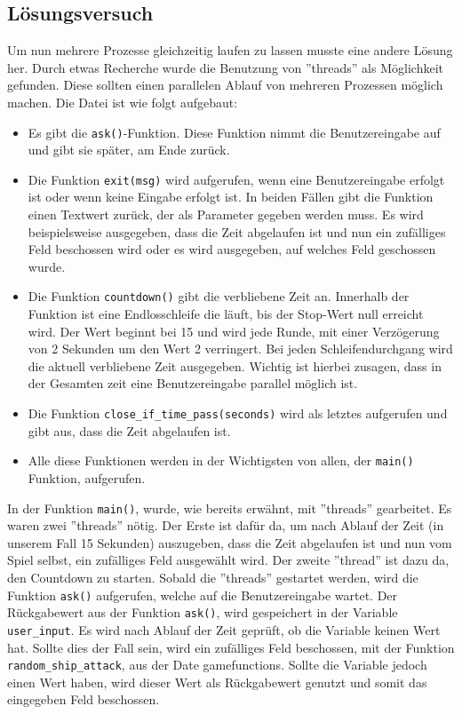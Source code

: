 \documentclass{article}
\begin{document}
\subsection{Lösungsversuch}
    Um nun mehrere Prozesse gleichzeitig laufen zu lassen musste eine andere Lösung her. Durch etwas Recherche wurde die Benutzung von ''threads'' als Möglichkeit gefunden. Diese sollten einen parallelen Ablauf von mehreren Prozessen möglich machen. Die Datei ist wie folgt aufgebaut:
    \setlist{}%
\begin{itemize}
\itemsep0em
    \item
    Es gibt die \verb$ask()$-Funktion. Diese Funktion nimmt die Benutzereingabe auf und gibt sie später, am Ende zurück.
    \item
    Die Funktion \verb$exit(msg)$ wird aufgerufen, wenn eine Benutzereingabe erfolgt ist oder wenn keine Eingabe erfolgt ist. In beiden Fällen gibt die Funktion einen Textwert zurück, der als Parameter gegeben werden muss. Es wird beispielsweise ausgegeben, dass die Zeit abgelaufen ist und nun ein zufälliges Feld beschossen wird oder es wird ausgegeben, auf welches Feld geschossen wurde.
    \item
    Die Funktion \verb$countdown()$ gibt die verbliebene Zeit an. Innerhalb der Funktion ist eine Endlosschleife die läuft, bis der Stop-Wert null erreicht wird. Der Wert beginnt bei 15 und wird  jede Runde, mit einer Verzögerung von 2 Sekunden um den Wert 2 verringert. Bei jeden Schleifendurchgang wird die aktuell verbliebene Zeit ausgegeben. Wichtig  ist hierbei zusagen, dass in der Gesamten zeit eine Benutzereingabe parallel möglich ist.
    \item
    Die Funktion \verb$close_if_time_pass(seconds)$ wird als letztes aufgerufen und gibt aus, dass die Zeit abgelaufen ist.
    \item
    Alle diese Funktionen werden in der Wichtigsten von allen, der \verb$main()$ Funktion, aufgerufen.
    \end{itemize}
    \par
    In der Funktion \verb$main()$, wurde, wie bereits erwähnt, mit ''threads'' gearbeitet. Es waren zwei ''threads'' nötig. Der Erste ist dafür da, um nach Ablauf der Zeit (in unserem Fall 15 Sekunden) auszugeben, dass die Zeit abgelaufen ist und nun vom Spiel selbst, ein zufälliges Feld ausgewählt wird. Der zweite ''thread'' ist dazu da, den Countdown zu starten. Sobald die ''threads'' gestartet werden, wird die Funktion \verb$ask()$ aufgerufen, welche auf die Benutzereingabe wartet. Der Rückgabewert aus der Funktion \verb$ask()$, wird gespeichert in der Variable \verb$user_input$. Es wird nach Ablauf der Zeit geprüft, ob die Variable keinen Wert hat. Sollte dies der Fall sein, wird ein zufälliges Feld beschossen, mit der Funktion \verb$random_ship_attack$, aus der Date gamefunctions. Sollte die Variable jedoch einen Wert haben, wird dieser Wert als Rückgabewert genutzt und somit das eingegeben Feld beschossen.
\end{document}
